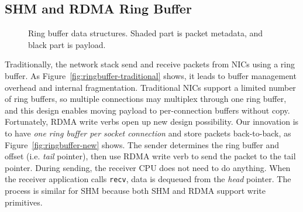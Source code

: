 \subsection{SHM and RDMA Ring Buffer}
\label{subsec:lockless-queue}

\begin{figure}[t]
	\centering
	\hspace{0.02\textwidth}
	\vspace{-10pt}
	\caption{Ring buffer data structures. Shaded part is packet metadata, and black part is payload.}
\end{figure}

Traditionally, the network stack send and receive packets from NICs using a ring buffer.
As Figure~\ref{fig:ringbuffer-traditional} shows, it leads to buffer management overhead and internal fragmentation.
Traditional NICs support a limited number of ring buffers, so multiple connections may multiplex through one ring buffer, and this design enables moving payload to per-connection buffers without copy.
Fortunately, RDMA write verbs open up new design possibility.
Our innovation is to have \emph{one ring buffer per socket connection} and store packets back-to-back, as Figure~\ref{fig:ringbuffer-new} shows.
The sender determines the ring buffer and offset (i.e. \emph{tail} pointer), then use RDMA write verb to send the packet to the tail pointer.
During sending, the receiver CPU does not need to do anything.
When the receiver application calls \texttt{recv}, data is dequeued from the \emph{head} pointer.
The process is similar for SHM because both SHM and RDMA support write primitives.

